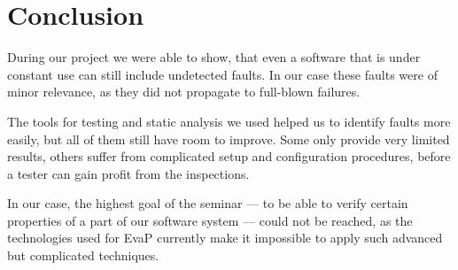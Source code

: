 \section{Conclusion}

During our project we were able to show, that even a software that is under constant use can still include undetected faults.
In our case these faults were of minor relevance, as they did not propagate to full-blown failures.

The tools for testing and static analysis we used helped us to identify faults more easily, but all of them still have room to improve.
Some only provide very limited results, others suffer from complicated setup and configuration procedures, before a tester can gain profit from the inspections.

In our case, the highest goal of the seminar --- to be able to verify certain properties of a part of our software system --- could not be reached, as the technologies used for EvaP currently make it impossible to apply such advanced but complicated techniques.
